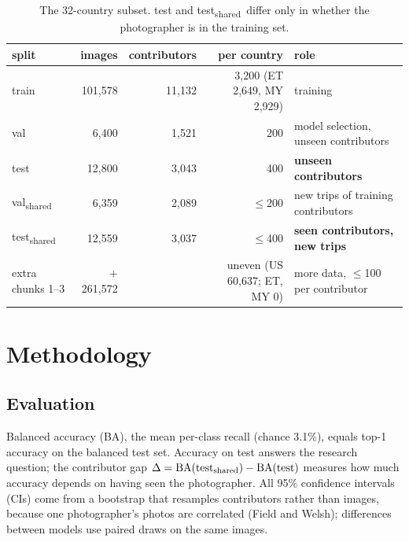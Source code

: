 \documentclass[clean,twocolumn]{bam-project}
\newcommand{\tsh}{test\textsubscript{shared}}
\newcommand{\vsh}{val\textsubscript{shared}}
\begin{document}
\begin{table}[!t]
\centering\small
\caption{The 32-country subset. test and \tsh\ differ only in whether the photographer is in the training set.}
\label{tab:data}
\setlength{\tabcolsep}{3.5pt}\footnotesize
\begin{tabular}{@{}lrrrl@{}}
\toprule
split & images & contributors & per country & role \\
\midrule
train & 101{,}578 & 11{,}132 & 3{,}200 (ET 2{,}649, MY 2{,}929) & training \\
val & 6{,}400 & 1{,}521 & 200 & model selection, unseen contributors \\
test & 12{,}800 & 3{,}043 & 400 & \textbf{unseen contributors} \\
\vsh & 6{,}359 & 2{,}089 & $\le$200 & new trips of training contributors \\
\tsh & 12{,}559 & 3{,}037 & $\le$400 & \textbf{seen contributors, new trips} \\
extra chunks 1--3 & $+$261{,}572 & & uneven (US 60{,}637; ET, MY 0) & more data, $\le$100 per contributor \\
\bottomrule
\end{tabular}
\end{table}

\section{Methodology}
\subsection{Evaluation}
Balanced accuracy (BA), the mean per-class recall (chance 3.1\%), equals top-1 accuracy on the balanced
test set. Accuracy on test answers the research question; the contributor gap
$\Delta=\mathrm{BA}(\text{\tsh})-\mathrm{BA}(\text{test})$ measures how much accuracy depends on having
seen the photographer. All 95\% confidence intervals (CIs) come from a bootstrap that resamples
contributors rather than images, because one photographer's photos are correlated (Field and Welsh);
differences between models use paired draws on the same images.
\end{document}
